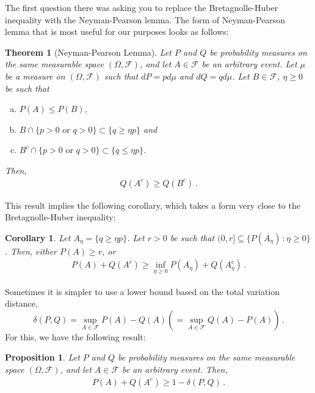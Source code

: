 \documentclass{article}
\newtheorem{theorem}{Theorem}
\newtheorem{corollary}{Corollary}
\newtheorem{proposition}{Proposition}
\DeclareMathOperator*{\1}{\mathbbm{1}}
\newcommand{\cF}{\mathcal{F}}
\theoremstyle{definition}
\theoremstyle{remark}
\begin{document}
The first question there was asking you to replace the Bretagnolle-Huber inequality with the Neyman-Pearson lemma.
The form of Neyman-Pearson lemma that is most useful for our purposes looks as follows:
\begin{theorem}[Neyman-Pearson Lemma]\label{thm:np}
Let $P$ and $Q$ be probability measures on the same measurable space $(\Omega, \cF)$, and let $A \in \cF$ be an arbitrary event. Let $\mu$ be a measure on $(\Omega,\cF)$ such that $dP = p d\mu$ and $dQ = q d\mu$.
Let $B\in \cF$, $\eta\ge 0$ be such that
\begin{enumerate}[(a)]
\item $P(A)\le P(B)$,
\item $B\cap \{p>0 \text{ or } q>0\} \subset \{ q\ge \eta p\}$ and \label{eq:npa} 
\item $B^c\cap \{p>0 \text{ or } q>0\} \subset \{ q\le \eta p\}$.  \label{eq:npb}
\end{enumerate}
Then,
\begin{align*}
Q(A^c)\ge Q(B^c)\,.
\end{align*}
\end{theorem} 
This result implies the following corollary, which takes a form very close to the Bretagnolle-Huber inequality:
\begin{corollary}\label{cor:np}
Let $A_\eta = \{q\ge \eta p\}$.
Let $r>0$ be such that $(0,r] \subseteq \{P(A_\eta)\,:\eta\ge 0\}$.
Then, either $P(A)\ge r$, or
\begin{align*}
P(A)+Q(A^c) \ge \inf_{\eta\ge 0} P(A_\eta) + Q(A_\eta^c)\,.
\end{align*}
\end{corollary}
Sometimes it is simpler to use a lower bound based on the total variation distance, 
\[
\delta(P,Q) = \sup_{A\in \cF} P(A) - Q(A) (=\sup_{A\in \cF} Q(A)-P(A))\,.
\]
For this, we have the following result:
\begin{proposition}\label{prop:tvlb}
Let $P$ and $Q$ be probability measures on the same measurable space $(\Omega, \cF)$, and let $A \in \cF$ be an arbitrary event. Then,
\begin{align*}
P(A)+Q(A^c) \ge 1 - \delta(P,Q)\,.
\end{align*}
\end{proposition} 
\end{document}
